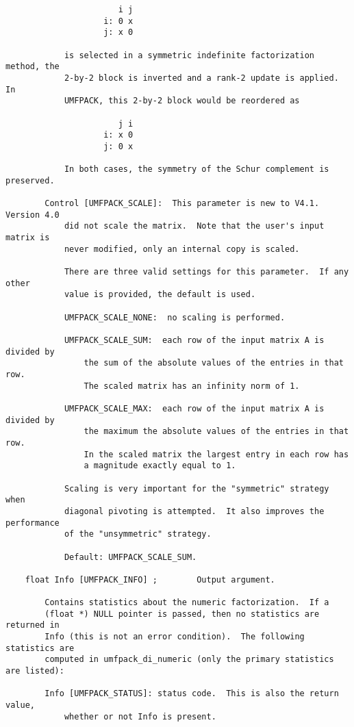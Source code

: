 \documentclass[11pt]{article}
\begin{document}
{\begin{verbatim}
                       i j
                    i: 0 x
                    j: x 0

            is selected in a symmetric indefinite factorization method, the
            2-by-2 block is inverted and a rank-2 update is applied.  In
            UMFPACK, this 2-by-2 block would be reordered as

                       j i
                    i: x 0
                    j: 0 x

            In both cases, the symmetry of the Schur complement is preserved.

        Control [UMFPACK_SCALE]:  This parameter is new to V4.1.  Version 4.0
            did not scale the matrix.  Note that the user's input matrix is
            never modified, only an internal copy is scaled.

            There are three valid settings for this parameter.  If any other
            value is provided, the default is used.

            UMFPACK_SCALE_NONE:  no scaling is performed.

            UMFPACK_SCALE_SUM:  each row of the input matrix A is divided by
                the sum of the absolute values of the entries in that row.
                The scaled matrix has an infinity norm of 1.

            UMFPACK_SCALE_MAX:  each row of the input matrix A is divided by
                the maximum the absolute values of the entries in that row.
                In the scaled matrix the largest entry in each row has
                a magnitude exactly equal to 1.

            Scaling is very important for the "symmetric" strategy when
            diagonal pivoting is attempted.  It also improves the performance
            of the "unsymmetric" strategy.

            Default: UMFPACK_SCALE_SUM.

    float Info [UMFPACK_INFO] ;        Output argument.

        Contains statistics about the numeric factorization.  If a
        (float *) NULL pointer is passed, then no statistics are returned in
        Info (this is not an error condition).  The following statistics are
        computed in umfpack_di_numeric (only the primary statistics are listed):

        Info [UMFPACK_STATUS]: status code.  This is also the return value,
            whether or not Info is present.


\end{verbatim}}
\end{document}
